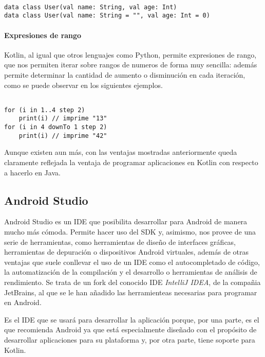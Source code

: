 \begin{verbatim}

data class User(val name: String, val age: Int)
data class User(val name: String = "", val age: Int = 0)

\end{verbatim}

\paragraph{Expresiones de rango}

Kotlin, al igual que otros lenguajes como Python, permite expresiones de rango, que nos permiten iterar sobre rangos de numeros de forma muy sencilla: además permite determinar la cantidad de aumento o disminución en cada iteración, como se puede observar en los siguientes ejemplos.

\begin{verbatim}

for (i in 1..4 step 2) 
	print(i) // imprime "13"
for (i in 4 downTo 1 step 2)
	print(i) // imprime "42"

\end{verbatim}

Aunque existen aun más, con las ventajas mostradas anteriormente queda claramente reflejada la ventaja de programar aplicaciones en Kotlin con respecto a hacerlo en Java.

\subsection{Android Studio}

Android Studio es un IDE que posibilita desarrollar para Android de manera mucho más cómoda. Permite hacer uso del SDK y, asimismo, nos provee de una serie de herramientas, como herramientas de diseño de interfaces gráficas, herramientas de depuración o dispositivos Android virtuales, además de otras ventajas que suele conllevar el uso de un IDE como el autocompletado de código, la automatización de la compilación y el desarrollo o herramientas de análisis de rendimiento. Se trata de un fork del conocido IDE \textit{IntelliJ IDEA}, de la compañia JetBrains, al que se le han añadido las herramienteas necesarias para programar en Android.

Es el IDE que se usará para desarrollar la aplicación porque, por una parte, es el que recomienda Android ya que está especialmente diseñado con el propósito de desarrollar aplicaciones para su plataforma y, por otra parte, tiene soporte para Kotlin.

